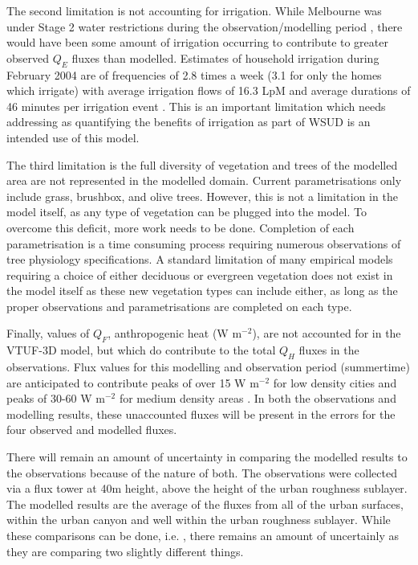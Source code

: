 \documentclass[final,3p,times,authoryear]{elsarticle}
\begin{document}
The second limitation is not accounting for irrigation. While Melbourne was under Stage 2 water restrictions during the observation/modelling period \citep{MelbourneWater2016a}, there would have been some amount of irrigation occurring to contribute to greater observed $Q_{E}$ fluxes than modelled. Estimates of household irrigation during February 2004 are of frequencies of 2.8 times a week (3.1 for only the homes which irrigate) with average irrigation flows of 16.3 LpM and average durations of 46 minutes per irrigation event \citep{Roberts2005}. This is an important limitation which needs addressing as quantifying the benefits of irrigation as part of WSUD is an intended use of this model.

The third limitation is the full diversity of vegetation and trees of the modelled area are not represented in the modelled domain. Current parametrisations only include grass, brushbox, and olive trees. However, this is not a limitation in the model itself, as any type of vegetation can be plugged into the model. To overcome this deficit, more work needs to be done. Completion of each parametrisation is a time consuming process requiring numerous observations of tree physiology specifications. A standard limitation of many empirical models requiring a choice of either deciduous or evergreen vegetation does not exist in the model itself as these new vegetation types can include either, as long as the proper observations and parametrisations are completed on each type.


Finally, values of $Q_{F}$, anthropogenic heat (W m$^{-2}$), are not accounted for in the VTUF-3D model, but which do contribute to the total $Q_{H}$ fluxes in the observations. Flux values for this modelling and observation period (summertime) are anticipated to contribute peaks of over 15 W m$^{-2}$ for low density cities and peaks of 30-60 W m$^{-2}$ for medium density areas \citep{Sailor2004}. In both the observations and modelling results, these unaccounted fluxes will be present in the errors for the four observed and modelled fluxes.

There will remain an amount of uncertainty in comparing the modelled results to the observations because of the nature of both. The observations were collected via a flux tower at 40m height, above the height of the urban roughness sublayer. The modelled results are the average of the fluxes from all of the urban surfaces, within the urban canyon and well within the urban roughness sublayer. While these comparisons can be done, i.e. \cite{Grimmond2011}, there remains an amount of uncertainly as they are comparing two slightly different things. 
\end{document}
